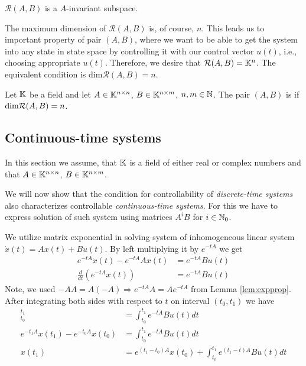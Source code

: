 \begin{remark}
	\label{rem:reachinv}
	$\mathcal{R}(A,B)$ is a $A$-invariant subspace.
\end{remark} 

The maximum dimension of $\mathcal{R}(A,B)$ is, of course, $n$. This leads us to important property of pair $(A,B)$, where we want to be able to get the system into any state in state space by controlling it with our control vector $u(t)$, i.e., choosing appropriate $u(t)$. Therefore, we desire that $\mathcal{R}(A,B)=\mathbb{K}^n$. The equivalent condition is $\text{dim}\mathcal{R}(A,B)=n$.

\begin{definition}
	Let $\mathbb{K}$ be a field and let $A \in \mathbb{K}^{n \times n}$, $B \in \mathbb{K}^{n \times m}$, $n,m \in \mathbb{N}$. The pair $(A,B)$ is  if $\textnormal{dim}\mathcal{R}(A,B)=n$.
\end{definition}

\subsection{Continuous-time systems}

\begin{remark}
	In this section we assume, that $\mathbb{K}$ is a field of either real or complex numbers and that $A\in\mathbb{K}^{n\times n}$, $B\in\mathbb{K}^{n\times m}$.
\end{remark}

We will now show that the condition for controllability of \textit{discrete-time systems} also characterizes controllable \textit{continuous-time systems}. For this we have to express solution of such system using matrices $A^iB$ for $i\in \mathbb{N}_0$. 

We utilize matrix exponential in solving system of inhomogeneous linear system $\dot{x}(t)=Ax(t)+Bu(t)$. By left multiplying it by $e^{-tA}$ we get
\begin{align*}
	e^{-tA}\dot{x}(t)-e^{-tA}Ax(t) &=e^{-tA}Bu(t) \\
	\frac{d}{dt} (e^{-tA}x(t)) &=e^{-tA}Bu(t) 
\end{align*}
Note, we used $-AA=A(-A)\Rightarrow e^{-tA}A=Ae^{-tA}$ from Lemma \ref{lem:expprop}. After integrating both sides with respect to $t$ on interval $(t_0,t_1)$ we have 
\begin{align*}
	[e^{-tA}x(t)]^{t_1}_{t_0}&=\int^{t_1}_{t_0}e^{-tA}Bu(t)dt \\
	e^{-t_1A}x(t_1)-e^{-t_0A}x(t_0)&=\int^{t_1}_{t_0}e^{-tA}Bu(t)dt \\
	x(t_1)&=e^{(t_1-t_0)A}x(t_0)+\int^{t_1}_{t_0}e^{(t_1-t)A}Bu(t)dt
\end{align*}

